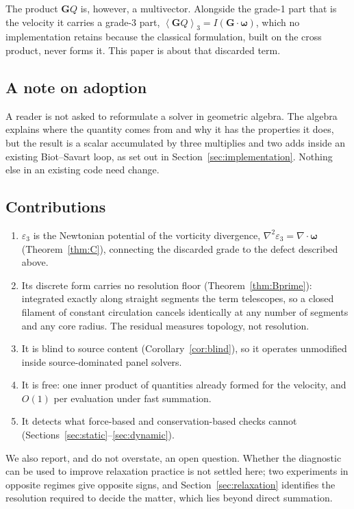 \documentclass[preprint,12pt,3p]{elsarticle}
\theoremstyle{remark}
\newcommand{\grade}[2]{\left\langle #1 \right\rangle_{#2}}
\newcommand{\eps}{\varepsilon_3}
\newcommand{\bG}{\mathbf{G}}
\newcommand{\bomega}{\boldsymbol{\omega}}
\begin{document}
The product $\bG Q$ is, however, a multivector. Alongside the grade-1 part that
is the velocity it carries a grade-3 part,
$\grade{\bG Q}{3} = I(\bG\cdot\bomega)$, which no implementation retains
because the classical formulation, built on the cross product, never forms it.
This paper is about that discarded term.

\subsection{A note on adoption}

A reader is not asked to reformulate a solver in geometric algebra. The algebra
explains where the quantity comes from and why it has the properties it does,
but the result is a scalar accumulated by three multiplies and two adds inside
an existing Biot--Savart loop, as set out in Section~\ref{sec:implementation}.
Nothing else in an existing code need change.

\subsection{Contributions}

\begin{enumerate}
\item $\eps$ is the Newtonian potential of the vorticity divergence,
  $\nabla^2\eps = \nabla\cdot\bomega$ (Theorem~\ref{thm:C}), connecting the
  discarded grade to the defect described above.
\item Its discrete form carries no resolution floor
  (Theorem~\ref{thm:Bprime}): integrated exactly along straight segments the
  term telescopes, so a closed filament of constant circulation cancels
  identically at any number of segments and any core radius. The residual
  measures topology, not resolution.
\item It is blind to source content (Corollary~\ref{cor:blind}), so it operates
  unmodified inside source-dominated panel solvers.
\item It is free: one inner product of quantities already formed for the
  velocity, and $O(1)$ per evaluation under fast summation.
\item It detects what force-based and conservation-based checks cannot
  (Sections~\ref{sec:static}--\ref{sec:dynamic}).
\end{enumerate}

We also report, and do not overstate, an open question. Whether the diagnostic
can be used to improve relaxation practice is not settled here; two experiments
in opposite regimes give opposite signs, and Section~\ref{sec:relaxation}
identifies the resolution required to decide the matter, which lies beyond
direct summation.
\end{document}
